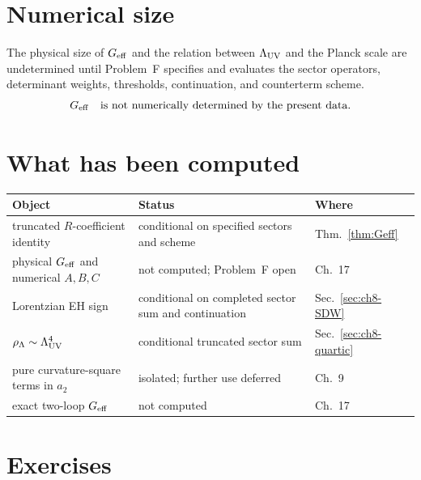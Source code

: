 \section{Numerical size}
\label{sec:ch8-size}

The physical size of \(G_{\mathrm{eff}}\) and the relation between \(\Lambda_{\mathrm{UV}}\) and
the Planck scale are undetermined until Problem~F specifies and
evaluates the sector operators, determinant weights, thresholds,
continuation, and counterterm scheme.
\begin{equation}
  \label{eq:Geff-size}
  G_{\mathrm{eff}}\quad\text{is not numerically determined by the present data.}
\end{equation}

\section{What has been computed}
\label{sec:ch8-status}

\begin{center}
\begin{tabular}{@{}p{}p{}p{}@{}}
\toprule
Object & Status & Where \\
\midrule
truncated \(R\)-coefficient identity & conditional on specified sectors and scheme & Thm.~\ref{thm:Geff} \\
physical \(G_{\mathrm{eff}}\) and numerical \(A,B,C\) & not computed; Problem~F open & Ch.~17 \\
Lorentzian EH sign & conditional on completed sector sum and continuation & Sec.~\ref{sec:ch8-SDW} \\
\(\rho_\Lambda\sim\Lambda_{\mathrm{UV}}^4\) & conditional truncated sector sum & Sec.~\ref{sec:ch8-quartic} \\
pure curvature-square terms in \(a_2\) & isolated; further use deferred & Ch.~9 \\
exact two-loop \(G_{\mathrm{eff}}\) & not computed & Ch.~17 \\
\bottomrule
\end{tabular}
\end{center}

\section{Exercises}
\label{sec:ch8-exercises}


